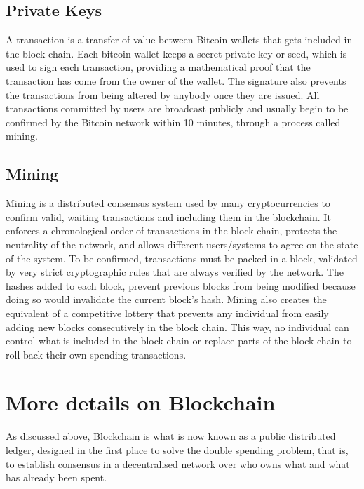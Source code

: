 \subsection{Private Keys}
A transaction is a transfer of value between Bitcoin wallets that gets included in the block chain. Each bitcoin wallet keeps a secret  private key or seed, which is used to sign each transaction, providing a mathematical proof that the transaction has come from the owner of the wallet. The signature also prevents the transactions from being altered by anybody once they are issued. All transactions committed by users are broadcast publicly and usually begin to be confirmed by the Bitcoin network within 10 minutes, through a process called mining.

\subsection{Mining}
Mining is a distributed consensus system used by many cryptocurrencies to confirm valid, waiting transactions and including them in the blockchain. It enforces a chronological order of transactions in the block chain, protects the neutrality of the network, and allows different users/systems to agree on the state of the system. To be confirmed, transactions must be packed in a block, validated by very strict cryptographic rules that are always verified by the network. The hashes added to each block, prevent previous blocks from being modified because doing so would invalidate the current block's hash. Mining also creates the equivalent of a competitive lottery that prevents any individual from easily adding new blocks consecutively in the block chain. This way, no individual can control what is included in the block chain or replace parts of the block chain to roll back their own spending transactions.

\section{More details on Blockchain}
As discussed above, Blockchain is what is now known as a public distributed ledger, designed in the first place to solve the double spending problem, that is, to establish consensus in a decentralised network over who owns what and what has already been spent\cite{Nakamoto2008Bitcoin:System}. 

